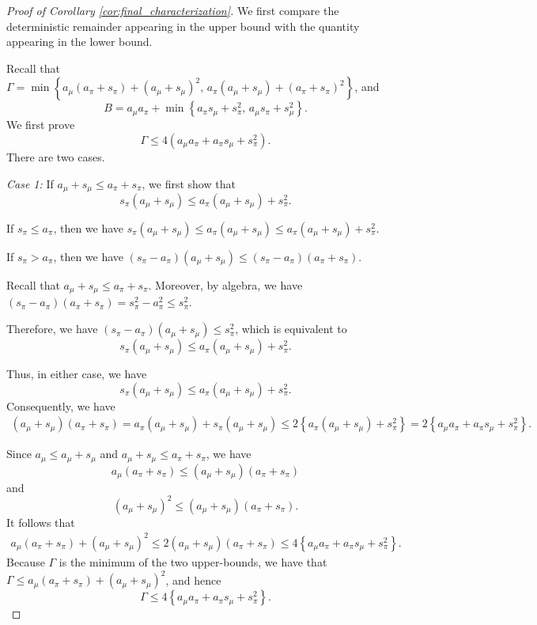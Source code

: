 \documentclass[11pt]{article}
\begin{document}
\begin{proof}[Proof of Corollary \ref{cor:final_characterization}]
We first compare the deterministic remainder appearing in the upper
bound with the quantity appearing in the lower bound.

Recall that $\Gamma=
\min\left\{
a_\mu(a_\pi+s_\pi)+(a_\mu+s_\mu)^2,\,
a_\pi(a_\mu+s_\mu)+(a_\pi+s_\pi)^2
\right\}$, and
\[
B
=
a_\mu a_\pi+
\min\left\{
a_\pi s_\mu+s_\pi^2,\,
a_\mu s_\pi+s_\mu^2
\right\}.
\]
We first prove
\[
\Gamma
\le
4\left(
a_\mu a_\pi+a_\pi s_\mu+s_\pi^2
\right).
\]
There are two cases.

\noindent
\emph{Case 1:}
If $
a_\mu+s_\mu\le a_\pi+s_\pi$, we first show that
\[
s_\pi(a_\mu+s_\mu)
\le
a_\pi(a_\mu+s_\mu)+s_\pi^2.
\]

If \(s_\pi\le a_\pi\), then we have
$s_\pi(a_\mu+s_\mu)\le
a_\pi(a_\mu+s_\mu)
\le
a_\pi(a_\mu+s_\mu)+s_\pi^2$.

If \(s_\pi>a_\pi\), then we have
$(s_\pi-a_\pi)(a_\mu+s_\mu)
\le
(s_\pi-a_\pi)(a_\pi+s_\pi)$.

Recall that $a_\mu+s_\mu\le a_\pi+s_\pi$. Moreover, by algebra, we have $(s_\pi-a_\pi)(a_\pi+s_\pi)
=
s_\pi^2-a_\pi^2
\le
s_\pi^2$.

Therefore, we have $(s_\pi-a_\pi)(a_\mu+s_\mu)\le s_\pi^2$,
which is equivalent to
\[
s_\pi(a_\mu+s_\mu)
\le
a_\pi(a_\mu+s_\mu)+s_\pi^2.
\]

Thus, in either case, we have
\[
s_\pi(a_\mu+s_\mu)
\le
a_\pi(a_\mu+s_\mu)+s_\pi^2.
\]
Consequently, we have
\begin{align*}
(a_\mu+s_\mu)(a_\pi+s_\pi)=
a_\pi(a_\mu+s_\mu)
+
s_\pi(a_\mu+s_\mu)
\le
2\left\{
a_\pi(a_\mu+s_\mu)+s_\pi^2
\right\}
=
2\left\{
a_\mu a_\pi+a_\pi s_\mu+s_\pi^2
\right\}.
\end{align*}

Since $a_\mu\le a_\mu+s_\mu$
and $a_\mu+s_\mu\le a_\pi+s_\pi$, we have
\[
a_\mu(a_\pi+s_\pi)
\le
(a_\mu+s_\mu)(a_\pi+s_\pi)
\]
and
\[
(a_\mu+s_\mu)^2
\le
(a_\mu+s_\mu)(a_\pi+s_\pi).
\]
It follows that
\begin{align*}
a_\mu(a_\pi+s_\pi)+(a_\mu+s_\mu)^2\le
2(a_\mu+s_\mu)(a_\pi+s_\pi)
\le
4\left\{
a_\mu a_\pi+a_\pi s_\mu+s_\pi^2
\right\}.
\end{align*}
Because \(\Gamma\) is the minimum of the two upper-bounds, we have that $\Gamma
\le
a_\mu(a_\pi+s_\pi)+(a_\mu+s_\mu)^2$, and hence
\[
\Gamma
\le
4\left\{
a_\mu a_\pi+a_\pi s_\mu+s_\pi^2
\right\}.
\]

\medskip


\end{proof}
\end{document}
